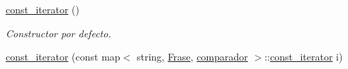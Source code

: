 \begin{DoxyCompactItemize}
\item 
\hyperlink{class_traductor_1_1const__iterator_ac864564e8a72514922903f6c553c3986}{const\+\_\+iterator} ()\hypertarget{class_traductor_1_1const__iterator_ac864564e8a72514922903f6c553c3986}{}\label{class_traductor_1_1const__iterator_ac864564e8a72514922903f6c553c3986}

\begin{DoxyCompactList}\small\item\em Constructor por defecto. \end{DoxyCompactList}\item 
\hyperlink{class_traductor_1_1const__iterator_af325de50c35d0c4478216061e870cd1c}{const\+\_\+iterator} (const map$<$ string, \hyperlink{class_frase}{Frase}, \hyperlink{classcomparador}{comparador} $>$\+::\hyperlink{class_traductor_1_1const__iterator}{const\+\_\+iterator} i)\hypertarget{class_traductor_1_1const__iterator_af325de50c35d0c4478216061e870cd1c}{}\label{class_traductor_1_1const__iterator_af325de50c35d0c4478216061e870cd1c}


\end{DoxyCompactItemize}
